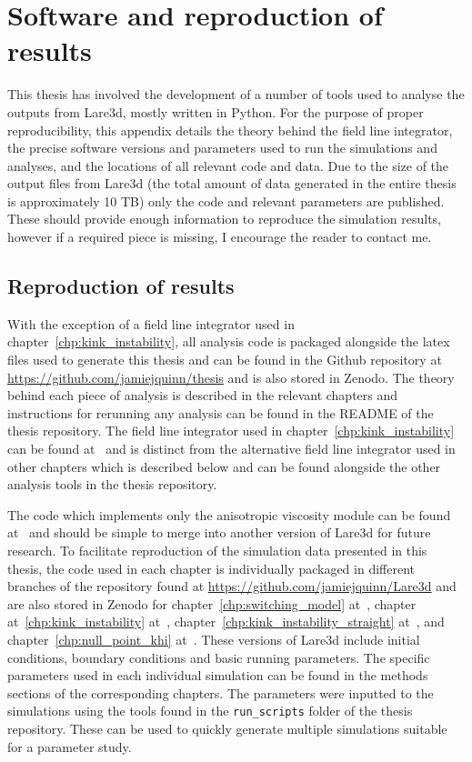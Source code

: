 \chapter{Software and reproduction of results}

This thesis has involved the development of a number of tools used to analyse the outputs from Lare3d, mostly written in Python. For the purpose of proper reproducibility, this appendix details the theory behind the field line integrator, the precise software versions and parameters used to run the simulations and analyses, and the locations of all relevant code and data. Due to the size of the output files from Lare3d (the total amount of data generated in the entire thesis is approximately 10 TB) only the code and relevant parameters are published. These should provide enough information to reproduce the simulation results, however if a required piece is missing, I encourage the reader to contact me.

\section{Reproduction of results}

With the exception of a field line integrator used in chapter~\ref{chp:kink_instability}, all analysis code is packaged alongside the latex files used to generate this thesis and can be found in the Github repository at \url{https://github.com/jamiejquinn/thesis} and is also stored in Zenodo. The theory behind each piece of analysis is described in the relevant chapters and instructions for rerunning any analysis can be found in the README of the thesis repository. The field line integrator used in chapter~\ref{chp:kink_instability} can be found at~\cite{jamie_j_quinn_2019_3560249} and is distinct from the alternative field line integrator used in other chapters which is described below and can be found alongside the other analysis tools in the thesis repository.

The code which implements only the anisotropic viscosity module can be found at~\cite{keith_bennett_2020_4155546} and should be simple to merge into another version of Lare3d for future research. To facilitate reproduction of the simulation data presented in this thesis, the code used in each chapter is individually packaged in different branches of the repository found at \url{https://github.com/jamiejquinn/Lare3d} and are also stored in Zenodo for chapter~\ref{chp:switching_model} at~\cite{keith_bennett_2020_4155661}, chapter at~\ref{chp:kink_instability} at~\cite{keith_bennett_2020_4155670}, chapter~\ref{chp:kink_instability_straight} at~\cite{keith_bennett_2020_4155625}, and chapter~\ref{chp:null_point_khi} at~\cite{keith_bennett_2020_4155646}. These versions of Lare3d include initial conditions, boundary conditions and basic running parameters. The specific parameters used in each individual simulation can be found in the methods sections of the corresponding chapters. The parameters were inputted to the simulations using the tools found in the \verb|run_scripts| folder of the thesis repository. These can be used to quickly generate multiple simulations suitable for a parameter study.

